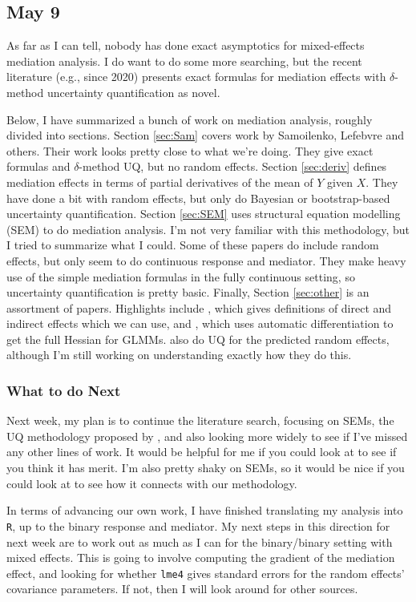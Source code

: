\documentclass{article}
\begin{document}
\subsection{May 9}

As far as I can tell, nobody has done exact asymptotics for mixed-effects mediation analysis. I do want to do some more searching, but the recent literature (e.g., since 2020) presents exact formulas for mediation effects with $\delta$-method uncertainty quantification as novel. 

Below, I have summarized a bunch of work on mediation analysis, roughly divided into sections. Section \ref{sec:Sam} covers work by Samoilenko, Lefebvre and others. Their work looks pretty close to what we're doing. They give exact formulas and $\delta$-method UQ, but no random effects. Section \ref{sec:deriv} defines mediation effects in terms of partial derivatives of the mean of $Y$ given $X$. They have done a bit with random effects, but only do Bayesian or bootstrap-based uncertainty quantification. Section \ref{sec:SEM} uses structural equation modelling (SEM) to do mediation analysis. I'm not very familiar with this methodology, but I tried to summarize what I could. Some of these papers do include random effects, but only seem to do continuous response and mediator. They make heavy use of the simple mediation formulas in the fully continuous setting, so uncertainty quantification is pretty basic. Finally, Section \ref{sec:other} is an assortment of papers. Highlights include \citet{Che21}, which gives definitions of direct and indirect effects which we can use, and \citet{Zhe21}, which uses automatic differentiation to get the full Hessian for GLMMs. \citeauthor{Zhe21} also do UQ for the predicted random effects, although I'm still working on understanding exactly how they do this.

\subsubsection{What to do Next}

Next week, my plan is to continue the literature search, focusing on SEMs, the UQ methodology proposed by \citet{Zhe21}, and also looking more widely to see if I've missed any other lines of work. It would be helpful for me if you could look at \citet{Zhe21} to see if you think it has merit. I'm also pretty shaky on SEMs, so it would be nice if you could look at \citet{Zig19} to see how it connects with our methodology.

In terms of advancing our own work, I have finished translating my analysis into \texttt{R}, up to the binary response and mediator. My next steps in this direction for next week are to work out as much as I can for the binary/binary setting with mixed effects. This is going to involve computing the gradient of the mediation effect, and looking for whether \texttt{lme4} gives standard errors for the random effects' covariance parameters. If not, then I will look around for other sources.
\end{document}
